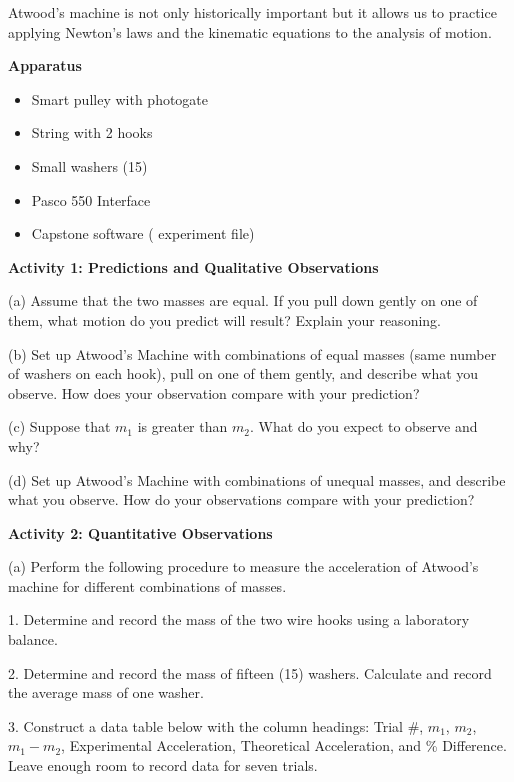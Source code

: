 Atwood's machine is not only historically important but it allows us to practice
applying Newton's laws and the kinematic equations to the analysis of motion.

\textbf{Apparatus} 

\begin{itemize}
\item Smart pulley with photogate 
\item String with 2 hooks 
\item Small washers (15)
\item Pasco 550 Interface
\item Capstone software ( experiment file)
\end{itemize}
\textbf{Activity 1: Predictions and Qualitative Observations} 

(a) Assume that the two masses are equal. If you pull down gently on one of
them, what motion do you predict will result? Explain your reasoning.
\vspace{20mm}

(b) Set up Atwood's Machine with combinations of equal masses (same number of
washers on each hook), pull on one of them gently, and describe what you observe.
How does your observation compare with your prediction?
\vspace{20mm}

(c) Suppose that \( m_{1} \) is greater than \( m_{2} \). What do you expect
to observe and why?
\vspace{20mm}

\pagebreak[2] 
(d) Set up Atwood's Machine with combinations of unequal masses, and describe
what you observe. How do your observations compare with your prediction?
\vspace{20mm}

\textbf{Activity 2: Quantitative Observations }

(a) Perform the following procedure to measure the acceleration of Atwood's
machine for different combinations of masses. 

1. Determine and record the mass of the two wire hooks using a laboratory balance.
\vspace{10mm}

2. Determine and record the mass of fifteen (15) washers. Calculate and record
the average mass of one washer.
\vspace{10mm}

3. Construct a data table below with the column headings: Trial \#, \( m_{1} \),
\( m_{2} \), \( m_{1}  - m_{2} \), Experimental Acceleration, Theoretical
Acceleration, and \% Difference. Leave enough room to record data for seven
trials.
\vspace{50mm}

